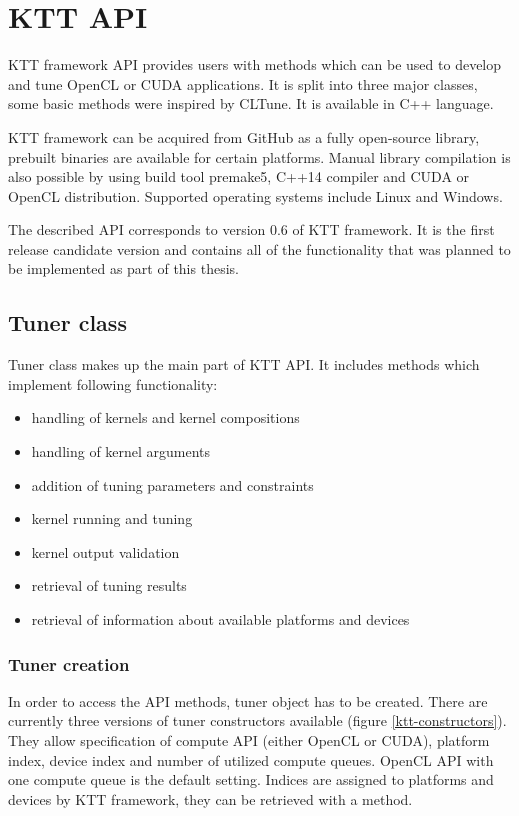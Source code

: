 \documentclass
[
    digital, %
    oneside, %
    table, %
    nolof, %
    nolot, %
    nocover %
]{fithesis3}
\begin{document}
\chapter{KTT API}
\label{ktt-api}
KTT framework API provides users with methods which can be used to develop and tune OpenCL or CUDA applications. It is split into three major
classes, some basic methods were inspired by CLTune. It is available in C++ language.

KTT framework can be acquired from GitHub as a fully open-source library, prebuilt binaries are available for certain platforms. Manual library
compilation is also possible by using build tool premake5, C++14 compiler and CUDA or OpenCL distribution. Supported operating systems include Linux
and Windows.

The described API corresponds to version 0.6 of KTT framework. It is the first release candidate version and contains all of the functionality that was
planned to be implemented as part of this thesis.

\section{Tuner class}
Tuner class makes up the main part of KTT API. It includes methods which implement following functionality:
\begin{itemize}
    \item handling of kernels and kernel compositions
    \item handling of kernel arguments
    \item addition of tuning parameters and constraints
    \item kernel running and tuning
    \item kernel output validation
    \item retrieval of tuning results
    \item retrieval of information about available platforms and devices
\end{itemize}

\subsection{Tuner creation}
In order to access the API methods, tuner object has to be created. There are currently three versions of tuner constructors available (figure 
\ref{ktt-constructors}). They allow specification of compute API (either OpenCL or CUDA), platform index, device index and number of utilized compute
queues. OpenCL API with one compute queue is the default setting. Indices are assigned to platforms and devices by KTT framework, they can be retrieved
with a method.
\end{document}
